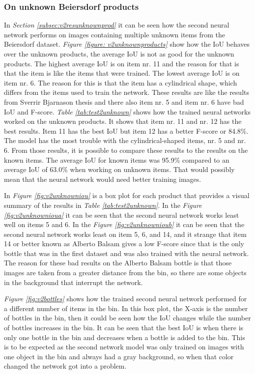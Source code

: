 \subsubsection{On unknown Beiersdorf products}
In \textit{Section \ref{subsec:v2resunknownprod}} it can be seen how the second neural network performs on images containing multiple unknown items from the Beiersdorf dataset. \textit{Figure \ref{figure: v2unknownproducts}} show how the IoU behaves over the unknown products, the average IoU is not as good for the unknown products. The highest average IoU is on item nr. 11 and the reason for that is that the item is like the items that were trained. The lowest average IoU is on item nr. 6. The reason for this is that the item has a cylindrical shape, which differs from the items used to train the network. These results are like the results from Sverrir Bjarnason thesis \cite{bjarnason_detecting_2021} and there also item nr. 5 and item nr. 6 have bad IoU and F-score.
\textit{Table \ref{tab:test2unknown}} shows how the trained neural networks worked on the unknown products. It shows that item nr. 11 and nr. 12 has the best results. Item 11 has the best IoU but item 12 has a better F-score or 84.8\%. The model has the most trouble with the cylindrical-shaped items, nr. 5 and nr. 6. From those results, it is possible to compare these results to the results on the known items. The average IoU for known items was 95.9\% compared to an average IoU of 63.0\% when working on unknown items. That would possibly mean that the neural network would need better training images. 

In \textit{Figure \ref{fig:v2unknowniou}} is a box plot for each product that provides a visual summary of the results in \textit{Table \ref{tab:test2unknown}}. In the \textit{Figure \ref{fig:v2unknownioua}} it can be seen that the second neural network works least well on items 5 and 6. In the \textit{Figure \ref{fig:v2unknownioub}} it can be seen that the second neural network works least on item 5, 6, and 14, and it strange that item 14 or better known as Alberto Balsam gives a low F-score since that is the only bottle that was in the first dataset and was also trained with the neural network. The reason for these bad results on the Alberto Balsam bottle is that those images are taken from a greater distance from the bin, so there are some objects in the background that interrupt the network. 

\textit{Figure \ref{fig:v2bottles}} shows how the trained second neural network performed for a different number of items in the bin. In this box plot, the X-axis is the number of bottles in the bin, then it could be seen how the IoU changes while the number of bottles increases in the bin. It can be seen that the best IoU is when there is only one bottle in the bin and decreases when a bottle is added to the bin. This is to be expected as the second network model was only trained on images with one object in the bin and always had a gray background, so when that color changed the network got into a problem.

